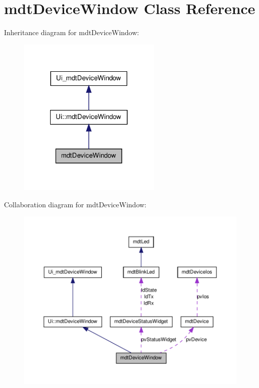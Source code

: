 \hypertarget{classmdt_device_window}{
\section{mdtDeviceWindow Class Reference}
\label{classmdt_device_window}
}


Inheritance diagram for mdtDeviceWindow:\nopagebreak
\begin{figure}[H]
\begin{center}
\leavevmode
\includegraphics[width=194pt]{classmdt_device_window__inherit__graph}
\end{center}
\end{figure}


Collaboration diagram for mdtDeviceWindow:
\nopagebreak
\begin{figure}[H]
\begin{center}
\leavevmode
\includegraphics[width=400pt]{classmdt_device_window__coll__graph}
\end{center}
\end{figure}

